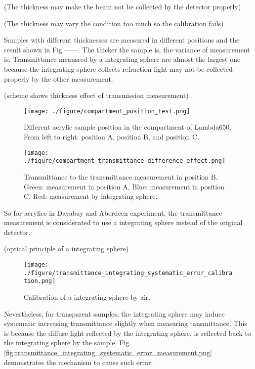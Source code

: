 (The thickness may make the beam not be collected by the detector properly)


(The thickness may vary the condition too much so the calibration fails)


Samples with different thicknesses are measured in different positions and
the result shown in Fig.------. The thicker the sample is, the variance of
measurement is. Transmittance meausred by a integrating sphere
are almost the largest one because the integrating sphere collects refraction light may
not be collected properly by the other measurement.

(scheme shows thickness effect of transmission measurement)
\begin{figure}
    \centering
    \texttt{[image: ./figure/compartment\_position\_test.png]}
    \caption{Different acrylic sample position in the compartment of Lambda650. From
 left to right: position A, position B, and position C.}
    \label{compartment_position_test.png}
    \end{figure}


\begin{figure}
    \centering
    \texttt{[image: ./figure/compartment\_transmittance\_difference\_effect.png]}
    \caption{Transmittance to the transmittance measurement in position B. Green: measurement in position A, Blue:
 measurement in position C. Red: measurement by integrating sphere.}
    \label{compartment_transmittance_difference_effect.png}
    \end{figure}


So for acrylics in Dayabay and Aberdeen experiment, the transmittance measurement is
considerated to use a integrating sphere instead of the original detector.


(optical principle of a integrating sphere)
\begin{figure}
    \centering
    \texttt{[image: ./figure/transmittance\_integrating\_systematic\_error\_calibration.png]}
    \caption{Calibration of a integrating sphere by air.}
    \label{fig:transmittance_integrating_systematic_error_calibration.png}
    \end{figure}


Nevertheless, for transparent samples, the integrating sphere
may induce systematic increasing transmittance slightly when measuring tansmittance.
This is because the diffuse light reflected by the integrating
sphere, is reflected back to the integrating sphere by the sample.
Fig. \ref{fig:transmittance_integrating_systematic_error_measurement.png} demonstrates the mechanism to cause such error.


